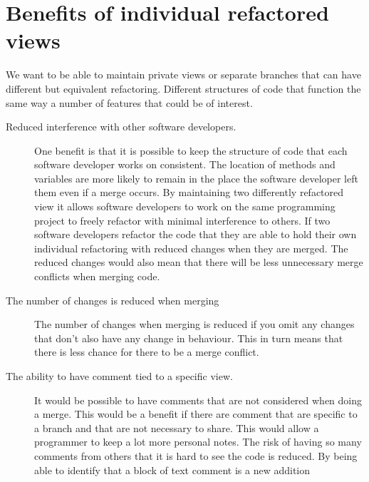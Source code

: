 
\section{Benefits of individual refactored views}
We want to be able to maintain private views or separate branches that can have different but equivalent refactoring. Different structures of code that function the same way a number of features that could be of interest.

\begin{description}

  \item [Reduced interference with other software developers.]   
  One benefit is that it is possible to keep the structure of code that each software developer works on consistent.  The location of methods and variables are more likely to remain in the place the software developer left them even if a merge occurs.
  By maintaining two differently refactored view it allows software developers to work on the same programming project to freely refactor with minimal interference to others.
  If two software developers refactor the code that they are able to hold their own individual refactoring with reduced changes when they are merged.
  The reduced changes would also mean that there will be less unnecessary merge conflicts when merging code.
  
  \item [The number of changes is reduced when merging] 
  The number of changes when merging is reduced if you omit any changes that don't also have any change in behaviour.  This in turn means that there is less chance for there to be a merge conflict.
  
  \item [The ability to have comment tied to a specific view.] 
  It would be possible to have comments that are not considered when doing a merge. This would be a benefit if there are comment that are specific to a branch and that are not necessary to share.  This would allow a programmer to keep a lot more personal notes.  The risk of having so many comments from others that it is hard to see the code is reduced. By being able to identify that a block of text comment is a new addition

\end{description}

